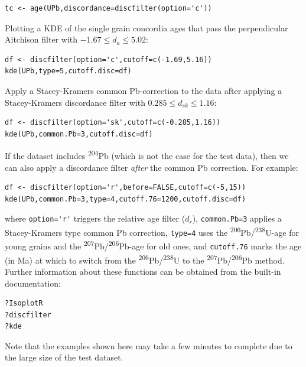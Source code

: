 \documentclass[gchron, manuscript]{copernicus}
\begin{document}
\begin{verbatim}
tc <- age(UPb,discordance=discfilter(option='c'))
\end{verbatim}

\noindent Plotting a KDE of the single grain concordia ages that pass
the perpendicular Aitchison filter with ${-1.67}\leq{d_a}\leq{5.02}$:

\begin{verbatim}
df <- discfilter(option='c',cutoff=c(-1.69,5.16))
kde(UPb,type=5,cutoff.disc=df)
\end{verbatim}

\noindent Apply a Stacey-Kramers common Pb-correction to the data after
applying a Stacey-Kramers discordance filter with
${0.285}\leq{d_{sk}}\leq{1.16}$:

\begin{verbatim}
df <- discfilter(option='sk',cutoff=c(-0.285,1.16))
kde(UPb,common.Pb=3,cutoff.disc=df)
\end{verbatim}

\noindent If the dataset includes \textsuperscript{204}Pb (which is
not the case for the test data), then we can also apply a discordance
filter \textit{after} the common Pb correction. For example:

\begin{verbatim}
df <- discfilter(option='r',before=FALSE,cutoff=c(-5,15))
kde(UPb,common.Pb=3,type=4,cutoff.76=1200,cutoff.disc=df)
\end{verbatim}

\noindent where \verb|option='r'| triggers the relative age filter
($d_r$), \texttt{common.Pb=3} applies a Stacey-Kramers type common Pb
correction, \texttt{type=4} uses the
\textsuperscript{206}Pb/\textsuperscript{238}U-age for young grains
and the \textsuperscript{207}Pb/\textsuperscript{206}Pb-age for old
ones, and \texttt{cutoff.76} marks the age (in Ma) at which to switch
from the \textsuperscript{206}Pb/\textsuperscript{238}U to the
\textsuperscript{207}Pb/\textsuperscript{206}Pb method. Further
information about these functions can be obtained from the built-in
documentation:

\begin{verbatim}
?IsoplotR
?discfilter
?kde
\end{verbatim}

\noindent Note that the examples shown here may take a few minutes to
complete due to the large size of the test dataset.

\conclusions
\label{sec:conclusions}
\end{document}
